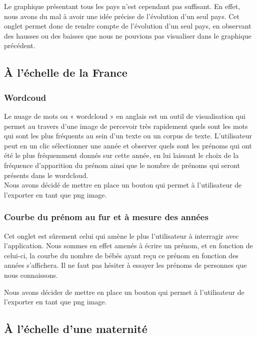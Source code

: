 \documentclass[
]{article}
\begin{document}
Le graphique présentant tous les pays n'est cependant pas suffisant. En
effet, nous avons du mal à avoir une idée précise de l'évolution d'un
seul pays. Cet onglet permet donc de rendre compte de l'évolution d'un
seul pays, en observant des hausses ou des baisses que nous ne pouvions
pas visualiser dans le graphique précédent.

\hypertarget{uxe0-luxe9chelle-de-la-france}{%
\subsection{À l'échelle de la
France}\label{uxe0-luxe9chelle-de-la-france}}

\hypertarget{wordcoud}{%
\subsubsection{Wordcoud}\label{wordcoud}}

Le nuage de mots ou « wordcloud » en anglais est un outil de
visualisation qui permet au travers d'une image de percevoir très
rapidement quels sont les mots qui sont les plus fréquents au sein d'un
texte ou un corpus de texte. L'utilisateur peut en un clic sélectionner
une année et observer quels sont les prénoms qui ont été le plus
fréquemment donnés sur cette année, en lui laissant le choix de la
fréquence d'apparition du prénom ainsi que le nombre de prénoms qui
seront présents dans le wordcloud.\\
Nous avons décidé de mettre en place un bouton qui permet à
l'utilisateur de l'exporter en tant que png image.

\hypertarget{courbe-du-pruxe9nom-au-fur-et-uxe0-mesure-des-annuxe9es}{%
\subsubsection{Courbe du prénom au fur et à mesure des
années}\label{courbe-du-pruxe9nom-au-fur-et-uxe0-mesure-des-annuxe9es}}

Cet onglet est sûrement celui qui amène le plus l'utilisateur à
interragir avec l'application. Nous sommes en effet amenés à écrire un
prénom, et en fonction de celui-ci, la courbe du nombre de bébés ayant
reçu ce prénom en fonction des années s'affichera. Il ne faut pas
hésiter à essayer les prénoms de personnes que nous connaissons.

Nous avons décider de mettre en place un bouton qui permet à
l'utilisateur de l'exporter en tant que png image.

\hypertarget{uxe0-luxe9chelle-dune-maternituxe9}{%
\subsection{À l'échelle d'une
maternité}\label{uxe0-luxe9chelle-dune-maternituxe9}}
\end{document}
